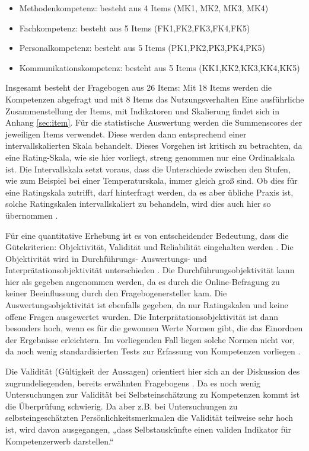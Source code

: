 \documentclass[12pt,smallheadings, bibliography=totoc]{scrartcl}
\begin{document}
\begin{itemize}
\tightlist
\item
  Methodenkompetenz: besteht aus 4 Items (MK1, MK2, MK3, MK4)
\item
  Fachkompetenz: besteht aus 5 Items (FK1,FK2,FK3,FK4,FK5)
\item
  Personalkompetenz: besteht aus 5 Items (PK1,PK2,PK3,PK4,PK5)
\item
  Kommunikationskompetenz: besteht aus 5 Items (KK1,KK2,KK3,KK4,KK5)
\end{itemize}

Insgesamt besteht der Fragebogen aus 26 Items: Mit 18 Items werden die
Kompetenzen abgefragt und mit 8 Items das Nutzungsverhalten Eine
ausführliche Zusammenstellung der Items, mit Indikatoren und Skalierung
findet sich in Anhang \ref{sec:item}. Für die statistische Auswertung
werden die Summenscores der jeweiligen Items verwendet. Diese werden
dann entsprechend einer intervallskalierten Skala behandelt. Dieses
Vorgehen ist kritisch zu betrachten, da eine Rating-Skala, wie sie hier
vorliegt, streng genommen nur eine Ordinalskala ist. Die Intervallskala
setzt voraus, dass die Unterschiede zwischen den Stufen, wie zum
Beispiel bei einer Temperaturskala, immer gleich groß sind. Ob dies für
eine Ratingskala zutrifft, darf hinterfragt werden, da es aber übliche
Praxis ist, solche Ratingskalen intervallskaliert zu behandeln, wird
dies auch hier so übernommen \parencite[65]{Sedlmeier2013}.

Für eine quantitative Erhebung ist es von entscheidender Bedeutung, dass
die Gütekriterien: Objektivität, Validität und Reliabilität eingehalten
werden \parencite[104]{Hader2015}. Die Objektivität wird in
Durchführungs- Auswertungs- und Interprätationsobjektivität
unterschieden \parencite[70]{Sedlmeier2013}. Die
Durchführungsobjektivität kann hier als gegeben angenommen werden, da es
durch die Online-Befragung zu keiner Beeinflussung durch den
Fragebogenersteller kam. Die Auswertungsobjektivität ist ebenfalls
gegeben, da nur Ratingskalen und keine offene Fragen ausgewertet wurden.
Die Interprätationsobjektivität ist dann besonders hoch, wenn es für die
gewonnen Werte Normen gibt, die das Einordnen der Ergebnisse
erleichtern. Im vorliegenden Fall liegen solche Normen nicht vor, da
noch wenig standardisierten Tests zur Erfassung von Kompetenzen
vorliegen \parencite{Braun2008}.

Die Validität (Gültigkeit der Aussagen) orientiert hier sich an der
Diskussion des zugrundeliegenden, bereits erwähnten Fragebogens
\parencite{Braun2008}. Da es noch wenig Untersuchungen zur Validität bei
Selbsteinschätzung zu Kompetenzen kommt ist die Überprüfung schwierig.
Da aber z.B. bei Untersuchungen zu selbsteingeschätzten
Persönlichkeitsmerkmalen die Validität teilweise sehr hoch ist, wird
davon ausgegangen, „dass Selbstauskünfte einen validen Indikator für
Kompetenzerwerb darstellen.`` \parencite[32]{Braun2008}
\end{document}
